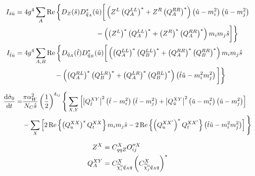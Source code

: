 \documentclass[english,notitlepage]{article}
\begin{document}
\begin{subequations}
\begin{align}
            \nonumber
            I_{\hat{s}\hat{u}} & = 4 g^4 \sum_{A} \operatorname{Re} \bigg\{ D_Z(\hat{s}) D^\ast_{\tilde{q}_A}(\hat{u}) \bigg[ \pclosed{Z^L \pclosed{Q_A^{LL}}^\ast + Z^R \pclosed{Q_A^{RR}}^\ast} \pclosed{\hat{u} - m_i^2} \pclosed{\hat{u} - m_j^2}                   \\
                               & \hspace{4.1cm} - \pclosed{\pclosed{Z^L}^\ast \pclosed{Q_A^{LL}}^\ast + \pclosed{Z^R}^\ast \pclosed{Q_A^{RR}}^\ast} m_i m_j \hat{s} \bigg] \bigg\}                                                                                      \\
            \nonumber
            I_{\hat{t}\hat{u}} & = 4 g^4 \sum_{A, B} \operatorname{Re} \bigg\{ D_{\tilde{q}_A}(\hat{t}) D^\ast_{\tilde{q}_B}(\hat{u}) \bigg[\pclosed{\pclosed{Q_A^{LL}}^\ast \pclosed{Q_B^{LL}}^\ast + \pclosed{Q_A^{RR}}^\ast \pclosed{Q_B^{RR}}^\ast} m_i m_j \hat{s} \\
                               & \hspace{2cm} - \pclosed{\pclosed{Q_A^{RL}}^\ast\pclosed{Q_B^{LR}}^\ast + \pclosed{Q_A^{LR}}^\ast\pclosed{Q_B^{RL}}^\ast} \pclosed{\hat{t}\hat{u} - m_i^2m_j^2}\bigg] \bigg\}
        \end{align}
    \end{subequations}


    \begin{align}
        \nonumber
        \d[t]{\hat{\sigma}_0} = & \frac{\pi \alpha_W^2}{N_C \hat{s}} \pclosed{\frac{1}{2}}^{\delta_{ij}} \Bigg\{ \sum_{X,Y} \bclosed{\abs{Q^{XY}_{\hat{t}}}^2 \pclosed{\hat{t}-m_i^2}\pclosed{\hat{t}-m_j^2} + \abs{Q^{XY}_{\hat{u}}}^2 \pclosed{\hat{u}-m_i^2}\pclosed{\hat{u}-m_j^2}} \\
                                & - \sum_X \bclosed{2\Re{\pclosed{Q_{u}^{XX}}^\ast Q_{t}^{XX}} m_i m_j \hat{s} - 2\Re{\pclosed{Q_{u}^{XX^\prime}}^\ast Q_{t}^{XX^\prime}} \pclosed{\hat{t}\hat{u} - m_i^2m_j^2}} \Bigg\}
    \end{align}

    \begin{subequations}
        \begin{align}
            Z^X      & = C_{qqZ}^X O_{ij}^{\prime\prime X}                                            \\
            Q_A^{XY} & = C_{\nino[i] \tilde{q}_A q}^{X} \pclosed{C_{\nino[j] \tilde{q}_A q}^{X}}^\ast
        \end{align}
    \end{subequations}
\end{document}
